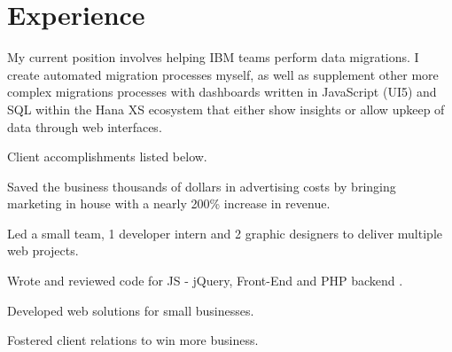 \documentclass[]{deedy-resume-openfont}
\begin{document}
\hfill
\begin{minipage}[t]{0.66\textwidth} 


\section{Experience}
\vspace{\topsep} %
\vspace{\topsep} %
\begin{tightemize}
\item My current position involves helping IBM teams perform data migrations. I create automated migration processes myself, as well as supplement other more complex migrations processes with dashboards written in JavaScript (UI5) and SQL within the Hana XS ecosystem that either show insights or allow upkeep of data through web interfaces.
\item Client accomplishments listed below.
\end{tightemize}
\sectionsep

\vspace{\topsep} %
\begin{tightemize}
\item Saved the business thousands of dollars in advertising costs by bringing marketing in house with a nearly 200\% increase in revenue.
\item Led a small team, 1 developer intern and 2 graphic designers to deliver multiple web projects.
\item Wrote and reviewed code for JS - jQuery, Front-End and PHP backend .
\end{tightemize}
\sectionsep

\begin{tightemize}
\item Developed web solutions for small businesses.
\item Fostered client relations to win more business.
\end{tightemize}
\sectionsep


\end{minipage}
\end{document}
